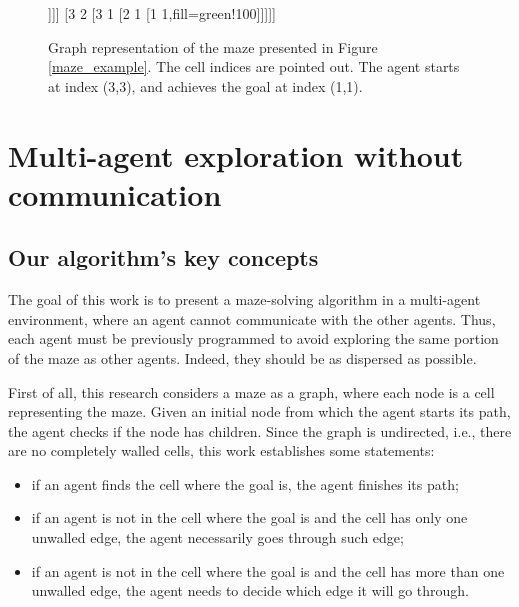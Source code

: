 \begin{figure}[ht!]
\centering
\begin{forest}
 [3 3,for tree={circle,draw},s sep=12mm,fill=red!100
 	[2 3
 		[2 2
 			[1 2
 				[1 3]]]]
 	[3 2
 		[3 1
 			[2 1
 				[1 1,fill=green!100]]]]]
\end{forest}
\caption{Graph representation of the maze presented in Figure \ref{maze_example}. The cell indices are pointed out. The agent starts at index (3,3), and achieves the goal at index (1,1).}
\label{maze_example_graph}
\end{figure}



\section{Multi-agent exploration without communication}
\label{section_models_exploration}
\subsection{Our algorithm's key concepts}
\label{section_models_exploration_key_concepts}
The goal of this work is to present a maze-solving algorithm in a multi-agent environment, where an agent cannot communicate with the other agents. Thus, each agent must be previously programmed to avoid exploring the same portion of the maze as other agents. Indeed, they should be as dispersed as possible.

First of all, this research considers a maze as a graph, where each node is a cell representing the maze. Given an initial node from which the agent starts its path, the agent checks if the node has children. Since the graph is undirected, i.e., there are no completely walled cells, this work establishes some statements:

\begin{itemize}
\item if an agent finds the cell where the goal is, the agent finishes its path;

\item if an agent is not in the cell where the goal is and the cell has only one unwalled edge, the agent necessarily goes through such edge;

\item if an agent is not in the cell where the goal is and the cell has more than one unwalled edge, the agent needs to decide which edge it will go through.
\end{itemize}

